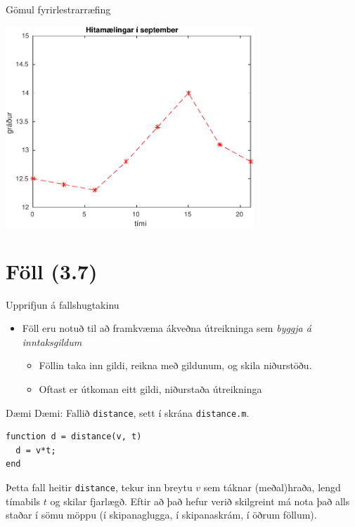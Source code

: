 \documentclass{beamer}
\begin{document}
\begin{frame}[fragile]{Gömul fyrirlestrarræfing}
\begin{center}
\includegraphics[width=0.7\textwidth]{Pics/septemberhiti}
\end{center}
\end{frame}

\section{Föll (3.7)}

\begin{frame}{Upprifjun á fallshugtakinu}
\begin{itemize}
 \item Föll eru notuð til að framkvæma ákveðna útreikninga sem \emph{byggja á inntaksgildum}
 \begin{itemize}
  \item Föllin taka inn gildi, reikna með gildunum, og skila niðurstöðu.
  \item Oftast er útkoman eitt gildi, niðurstaða útreikninga
 \end{itemize}
\end{itemize}
\end{frame}

\begin{frame}[fragile]{Dæmi}
Dæmi: Fallið \texttt{distance}, sett í skrána \texttt{distance.m}.
\begin{verbatim}
function d = distance(v, t)
  d = v*t;
end  
\end{verbatim}
Þetta fall heitir \texttt{distance}, tekur inn breytu $v$ sem táknar (meðal)hraða, lengd tímabils $t$ og skilar fjarlægð. Eftir að það hefur verið skilgreint má nota það alls staðar í sömu möppu (í skipanaglugga, í skipanaskrám, í öðrum föllum).
\end{frame}
\end{document}
